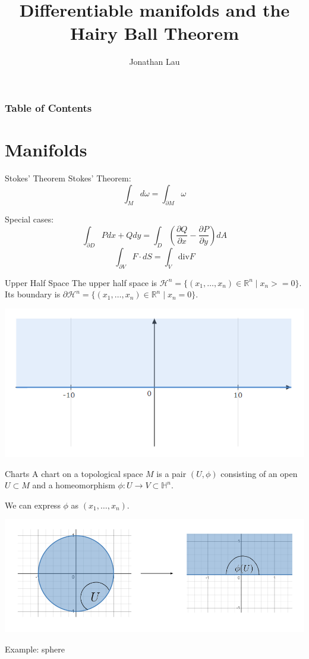 \documentclass[9pt]{beamer}
\title[Differentiable manifolds and the Hairy Ball Theorem]
{Differentiable manifolds and the Hairy Ball Theorem}
\author[Jonathan Lau] %
{Jonathan Lau}
\begin{document}
	
\frame{\titlepage}

\begin{frame}
	\frametitle{Table of Contents}
	\tableofcontents
\end{frame}

\section{Manifolds}
	
\begin{frame}{Stokes' Theorem}
    Stokes' Theorem:\[\int_Md\omega = \int_{\partial M} \omega\]

    Special cases: \[\int_{\partial D} Pdx+Qdy = \int_D \left(\frac{\partial Q}{\partial x}-\frac{\partial P}{\partial y}\right) dA\]
    \[\int_{\partial V}  F\cdot dS = \int_V \text{div} F\]
\end{frame}

\begin{frame}
    \begin{block}{Upper Half Space}
        The upper half space is $\mathcal{H}^n=\{(x_1, \dots, x_n)\in \mathbb{R}^n\mid x_n >= 0\}$. Its boundary is $\partial \mathcal{H}^n = \{(x_1, \dots, x_n)\in \mathbb{R}^n\mid x_n = 0\}$.
    \end{block}
    \includegraphics[scale=0.6]{upper_half.PNG}

\end{frame}
\begin{frame}
    \begin{block}{Charts}
        A chart on a topological space $M$ is a pair $(U, \phi)$ consisting of an open $U\subset M$ and a homeomorphism $\phi:U\rightarrow V\subset\mathbb{H}^n$.
    \end{block}

    We can express $\phi$ as $(x_1, \dots, x_n)$.

    \includegraphics[scale=0.6]{chart.PNG}

    Example: sphere
    
\end{frame}
\end{document}
